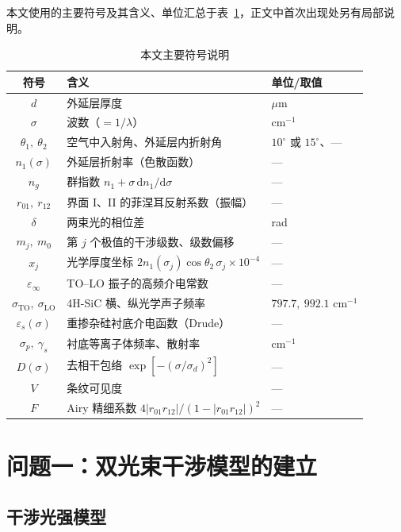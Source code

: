 \documentclass[11pt,a4paper,fontset=fandol]{ctexart}
\begin{document}
本文使用的主要符号及其含义、单位汇总于表~\ref{tab:symbols}，正文中首次出现处另有局部说明。
\begin{table}[!htb]
    \centering
    \caption{本文主要符号说明}
    \label{tab:symbols}
    \small
    \begin{tabular}{cll}
        \toprule
        符号 & 含义 & 单位/取值 \\
        \midrule
        $d$ & 外延层厚度 & $\mu$m \\
        $\sigma$ & 波数（$=1/\lambda$） & cm$^{-1}$ \\
        $\theta_1,\ \theta_2$ & 空气中入射角、外延层内折射角 & $10^\circ$ 或 $15^\circ$、— \\
        $n_1(\sigma)$ & 外延层折射率（色散函数） & — \\
        $n_g$ & 群指数 $n_1+\sigma\,\mathrm{d}n_1/\mathrm{d}\sigma$ & — \\
        $r_{01},\ r_{12}$ & 界面 I、II 的菲涅耳反射系数（振幅） & — \\
        $\delta$ & 两束光的相位差 & rad \\
        $m_j,\ m_0$ & 第 $j$ 个极值的干涉级数、级数偏移 & — \\
        $x_j$ & 光学厚度坐标 $2n_1(\sigma_j)\cos\theta_2\,\sigma_j\times10^{-4}$ & — \\
        $\varepsilon_\infty$ & TO--LO 振子的高频介电常数 & — \\
        $\sigma_{\mathrm{TO}},\ \sigma_{\mathrm{LO}}$ & 4H-SiC 横、纵光学声子频率 & $797.7,\ 992.1$ cm$^{-1}$ \\
        $\varepsilon_s(\sigma)$ & 重掺杂硅衬底介电函数（Drude） & — \\
        $\sigma_p,\ \gamma_s$ & 衬底等离子体频率、散射率 & cm$^{-1}$ \\
        $D(\sigma)$ & 去相干包络 $\exp[-(\sigma/\sigma_d)^2]$ & — \\
        $V$ & 条纹可见度 & — \\
        $F$ & Airy 精细系数 $4|r_{01}r_{12}|/(1-|r_{01}r_{12}|)^2$ & — \\
        \bottomrule
    \end{tabular}
\end{table}

\section{问题一：双光束干涉模型的建立}

\subsection{干涉光强模型}
\end{document}
